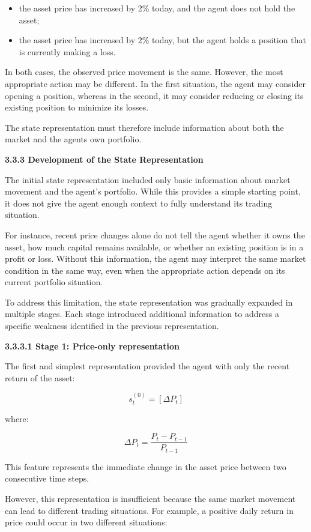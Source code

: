 \begin{itemize}
\item
  the asset price has increased by 2\% today, and the agent does not
  hold the asset;
\item
  the asset price has increased by 2\% today, but the agent holds a
  position that is currently making a loss.
\end{itemize}

In both cases, the observed price movement is the same. However, the
most appropriate action may be different. In the first situation, the
agent may consider opening a position, whereas in the second, it may
consider reducing or closing its existing position to minimize its
losses.

The state representation must therefore include information about both
the market and the agent\textquotesingle s own portfolio.

\textbf{3.3.3 Development of the State Representation}

The initial state representation included only basic information about
market movement and the agent's portfolio. While this provides a simple
starting point, it does not give the agent enough context to fully
understand its trading situation.

For instance, recent price changes alone do not tell the agent whether
it owns the asset, how much capital remains available, or whether an
existing position is in a profit or loss. Without this information, the
agent may interpret the same market condition in the same way, even when
the appropriate action depends on its current portfolio situation.

To address this limitation, the state representation was gradually
expanded in multiple stages. Each stage introduced additional
information to address a specific weakness identified in the previous
representation.

\textbf{3.3.3.1 Stage 1: Price-only representation}

The first and simplest representation provided the agent with only the
recent return of the asset:

\[s_{t}^{(0)} = \left\lbrack \Delta P_{t} \right\rbrack\]

where:

\[\Delta P_{t} = \frac{P_{t} - P_{t - 1}}{P_{t - 1}}\]

This feature represents the immediate change in the asset price between
two consecutive time steps.

However, this representation is insufficient because the same market
movement can lead to different trading situations. For example, a
positive daily return in price could occur in two different situations:

